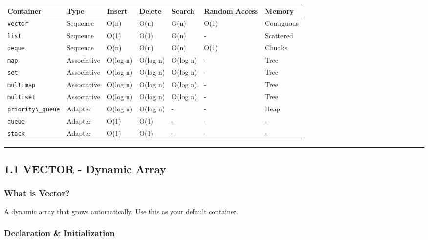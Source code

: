 \begin{longtable}[]{@{}lllllll@{}}
\toprule
Container & Type & Insert & Delete & Search & Random Access & Memory \\
\midrule
\endhead
\passthrough{\lstinline!vector!} & Sequence & O(n) & O(n) & O(n) & O(1)
& Contiguous \\
\passthrough{\lstinline!list!} & Sequence & O(1) & O(1) & O(n) & - &
Scattered \\
\passthrough{\lstinline!deque!} & Sequence & O(n) & O(n) & O(n) & O(1) &
Chunks \\
\passthrough{\lstinline!map!} & Associative & O(log n) & O(log n) &
O(log n) & - & Tree \\
\passthrough{\lstinline!set!} & Associative & O(log n) & O(log n) &
O(log n) & - & Tree \\
\passthrough{\lstinline!multimap!} & Associative & O(log n) & O(log n) &
O(log n) & - & Tree \\
\passthrough{\lstinline!multiset!} & Associative & O(log n) & O(log n) &
O(log n) & - & Tree \\
\passthrough{\lstinline!priority\_queue!} & Adapter & O(log n) & O(log
n) & - & - & Heap \\
\passthrough{\lstinline!queue!} & Adapter & O(1) & O(1) & - & - & - \\
\passthrough{\lstinline!stack!} & Adapter & O(1) & O(1) & - & - & - \\
\bottomrule
\end{longtable}

\begin{center}\rule{0.5\linewidth}{0.5pt}\end{center}

\hypertarget{vector---dynamic-array}{%
\subsection{1.1 VECTOR - Dynamic Array}\label{vector---dynamic-array}}

\hypertarget{what-is-vector}{%
\subsubsection{What is Vector?}\label{what-is-vector}}

A dynamic array that grows automatically. Use this as your default
container.

\hypertarget{declaration-initialization}{%
\subsubsection{Declaration \&
Initialization}\label{declaration-initialization}}

